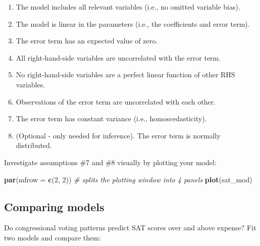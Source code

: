 \documentclass[]{book}
\newenvironment{Shaded}{\begin{snugshade}}{\end{snugshade}}
\newcommand{\CommentTok}[1]{\textcolor[rgb]{0.56,0.35,0.01}{\textit{#1}}}
\newcommand{\DataTypeTok}[1]{\textcolor[rgb]{0.13,0.29,0.53}{#1}}
\newcommand{\DecValTok}[1]{\textcolor[rgb]{0.00,0.00,0.81}{#1}}
\newcommand{\KeywordTok}[1]{\textcolor[rgb]{0.13,0.29,0.53}{\textbf{#1}}}
\newcommand{\NormalTok}[1]{#1}
\newcommand{\OperatorTok}[1]{\textcolor[rgb]{0.81,0.36,0.00}{\textbf{#1}}}
\newcommand{\StringTok}[1]{\textcolor[rgb]{0.31,0.60,0.02}{#1}}
\providecommand{\tightlist}{%
  \setlength{\itemsep}{0pt}\setlength{\parskip}{0pt}}
\begin{document}
\begin{enumerate}
\def\labelenumi{\arabic{enumi}.}
\tightlist
\item
  The model includes all relevant variables (i.e., no omitted variable bias).
\item
  The model is linear in the parameters (i.e., the coefficients and error term).
\item
  The error term has an expected value of zero.
\item
  All right-hand-side variables are uncorrelated with the error term.
\item
  No right-hand-side variables are a perfect linear function of other RHS variables.
\item
  Observations of the error term are uncorrelated with each other.
\item
  The error term has constant variance (i.e., homoscedasticity).
\item
  (Optional - only needed for inference). The error term is normally distributed.
\end{enumerate}

Investigate assumptions \#7 and \#8 visually by plotting your model:

\begin{Shaded}
\begin{Highlighting}[]
  \KeywordTok{par}\NormalTok{(}\DataTypeTok{mfrow =} \KeywordTok{c}\NormalTok{(}\DecValTok{2}\NormalTok{, }\DecValTok{2}\NormalTok{)) }\CommentTok{# splits the plotting window into 4 panels}
  \KeywordTok{plot}\NormalTok{(sat_mod)}
\end{Highlighting}
\end{Shaded}

\hypertarget{comparing-models}{%
\subsection{Comparing models}\label{comparing-models}}

Do congressional voting patterns predict SAT scores over and above expense? Fit two models and compare them:

\begin{Shaded}
\end{Shaded}
\end{document}

